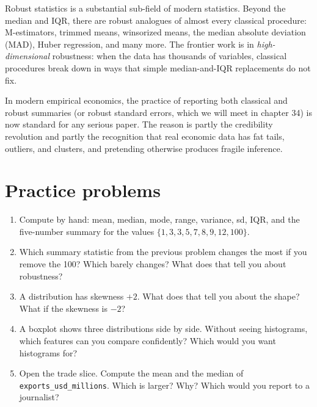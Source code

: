 \documentclass[
  letterpaper,
  11pt,
  twoside,
  openany]{scrbook}
\begin{document}
\begin{tcolorbox}[enhanced jigsaw, arc=.35mm, bottomrule=.15mm, bottomtitle=1mm, breakable, colback=white, colbacktitle=quarto-callout-important-color!10!white, colframe=quarto-callout-important-color-frame, coltitle=black, left=2mm, leftrule=.75mm, opacityback=0, opacitybacktitle=0.6, rightrule=.15mm, title=\textcolor{quarto-callout-important-color}{\faExclamation}\hspace{0.5em}{Frontier note}, titlerule=0mm, toprule=.15mm, toptitle=1mm]

Robust statistics is a substantial sub-field of modern statistics.
Beyond the median and IQR, there are robust analogues of almost every
classical procedure: M-estimators, trimmed means, winsorized means, the
median absolute deviation (MAD), Huber regression, and many more. The
frontier work is in \emph{high-dimensional} robustness: when the data
has thousands of variables, classical procedures break down in ways that
simple median-and-IQR replacements do not fix.

In modern empirical economics, the practice of reporting both classical
and robust summaries (or robust standard errors, which we will meet in
chapter 34) is now standard for any serious paper. The reason is partly
the credibility revolution and partly the recognition that real economic
data has fat tails, outliers, and clusters, and pretending otherwise
produces fragile inference.

\end{tcolorbox}

\section{Practice problems}\label{practice-problems-4}

\begin{enumerate}
\def\labelenumi{\arabic{enumi}.}
\item
  Compute by hand: mean, median, mode, range, variance, sd, IQR, and the
  five-number summary for the values
  \(\{1, 3, 3, 5, 7, 8, 9, 12, 100\}\).
\item
  Which summary statistic from the previous problem changes the most if
  you remove the 100? Which barely changes? What does that tell you
  about robustness?
\item
  A distribution has skewness \(+2\). What does that tell you about the
  shape? What if the skewness is \(-2\)?
\item
  A boxplot shows three distributions side by side. Without seeing
  histograms, which features can you compare confidently? Which would
  you want histograms for?
\item
  Open the trade slice. Compute the mean and the median of
  \texttt{exports\_usd\_millions}. Which is larger? Why? Which would you
  report to a journalist?
\end{enumerate}
\end{document}
